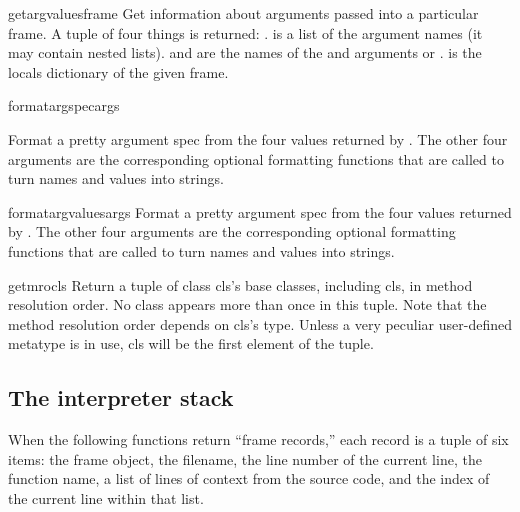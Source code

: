 \begin{funcdesc}{getargvalues}{frame}
  Get information about arguments passed into a particular frame.
  A tuple of four things is returned: .
   is a list of the argument names (it may contain nested
  lists).
   and  are the names of the \code{*} and
  \code{**} arguments or .
   is the locals dictionary of the given frame.
\end{funcdesc}

\begin{funcdesc}{formatargspec}{args}

  Format a pretty argument spec from the four values returned by
  .  The other four arguments are the
  corresponding optional formatting functions that are called to turn
  names and values into strings.
\end{funcdesc}

\begin{funcdesc}{formatargvalues}{args}
  Format a pretty argument spec from the four values returned by
  .  The other four arguments are the
  corresponding optional formatting functions that are called to turn
  names and values into strings.
\end{funcdesc}

\begin{funcdesc}{getmro}{cls}
  Return a tuple of class cls's base classes, including cls, in
  method resolution order.  No class appears more than once in this tuple.
  Note that the method resolution order depends on cls's type.  Unless a
  very peculiar user-defined metatype is in use, cls will be the first
  element of the tuple.
\end{funcdesc}

\subsection{The interpreter stack
            \label{inspect-stack}}

When the following functions return ``frame records,'' each record
is a tuple of six items: the frame object, the filename,
the line number of the current line, the function name, a list of
lines of context from the source code, and the index of the current
line within that list.

